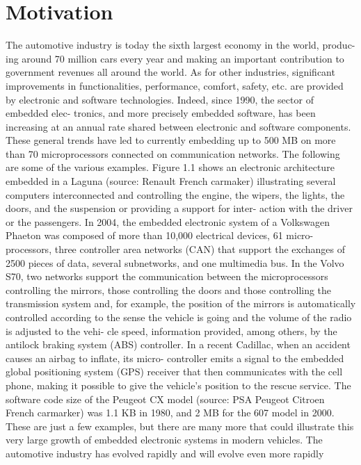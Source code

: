 \section{Motivation}
The automotive industry is today the sixth largest economy in the world, produc-
ing around 70 million cars every year and making an important contribution to
government revenues all around the world. As for other industries, significant
improvements in functionalities, performance, comfort, safety, etc. are provided by
electronic and software technologies. Indeed, since 1990, the sector of embedded elec-
tronics, and more precisely embedded software, has been increasing at an annual rate
shared between electronic and software components. These general trends have led to
currently embedding up to 500 MB on more than 70 microprocessors connected
on communication networks. The following are some of the various examples. Figure
1.1 shows an electronic architecture embedded in a Laguna (source: Renault French
carmaker) illustrating several computers interconnected and controlling the engine,
the wipers, the lights, the doors, and the suspension or providing a support for inter-
action with the driver or the passengers. In 2004, the embedded electronic system of a
Volkswagen Phaeton was composed of more than 10,000 electrical devices, 61 micro-
processors, three controller area networks (CAN) that support the exchanges of 2500
pieces of data, several subnetworks, and one multimedia bus. In the Volvo S70,
two networks support the communication between the microprocessors controlling
the mirrors, those controlling the doors and those controlling the transmission system
and, for example, the position of the mirrors is automatically controlled according to
the sense the vehicle is going and the volume of the radio is adjusted to the vehi-
cle speed, information provided, among others, by the antilock braking system (ABS)
controller. In a recent Cadillac, when an accident causes an airbag to inflate, its micro-
controller emits a signal to the embedded global positioning system (GPS) receiver
that then communicates with the cell phone, making it possible to give the vehicle’s
position to the rescue service. The software code size of the Peugeot CX model (source:
PSA Peugeot Citroen French carmarker) was 1.1 KB in 1980, and 2 MB for the 607
model in 2000. These are just a few examples, but there are many more that could
illustrate this very large growth of embedded electronic systems in modern vehicles.
The automotive industry has evolved rapidly and will evolve even more rapidly
